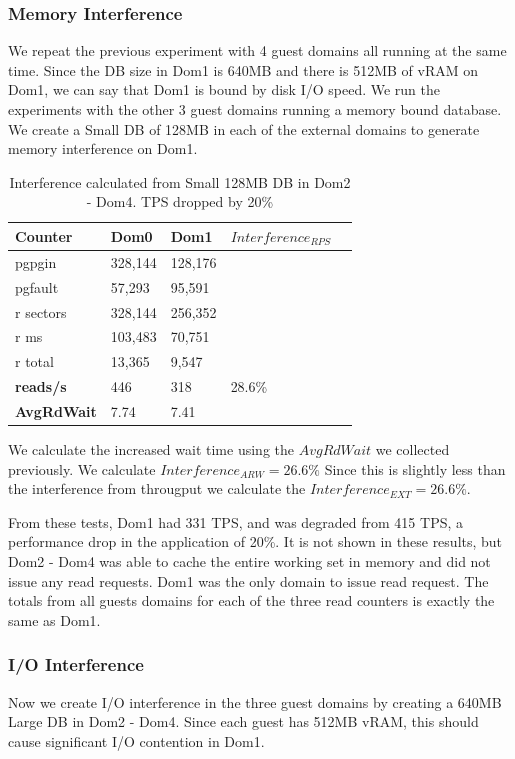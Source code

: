 \subsubsection{Memory Interference}
We repeat the previous experiment with 4 guest domains all running at the same time.  Since the DB size in Dom1 is 640MB and there is 512MB of vRAM on Dom1, we can say that Dom1 is bound by disk I/O speed.  We run the experiments with the other 3 guest domains running a memory bound database.  
We create a Small DB of 128MB in each of the external domains to generate memory interference on Dom1.

\begin{table}[h]
\begin{tabular}{ l l l l p{5cm} }
  Counter & Dom0 & Dom1 & $Interference_{RPS}$ \\
  \hline
	pgpgin    & 328,144 & 128,176 &  \\
	pgfault   &  57,293 &  95,591 &  \\
	r sectors & 328,144 & 256,352 &  \\
	r ms      & 103,483 &  70,751 &  \\
	r total   &  13,365 &   9,547 &  \\
    \textbf{reads/s}    & 446 & 318 & 28.6\%  \\
    \textbf{AvgRdWait}  & 7.74 & 7.41 & \\ 
  \hline
\end{tabular}
\caption{Interference calculated from Small 128MB DB in Dom2 - Dom4.  TPS dropped by 20\%} 
\label{fig:InterferenceSm}
\end{table}
We calculate the increased wait time using the $AvgRdWait$ we collected previously. We calculate $Interference_{ARW} = 26.6\%$  Since this is slightly less than the interference from througput we calculate the $Interference_{EXT} = 26.6\%$.

From these tests, Dom1 had 331 TPS, and was degraded from 415 TPS, a performance drop in the application of 20\%.  It is not shown in these results, but Dom2 - Dom4 was able to cache the entire working set in memory and did not issue any read requests.  Dom1 was the only domain to issue read request. The totals from all guests domains for each of the three read counters is exactly the same as Dom1.  

\subsubsection{I/O Interference}
Now we create I/O interference in the three guest domains by creating a 640MB Large DB in Dom2 - Dom4.  Since each guest has 512MB vRAM, this should cause significant I/O contention in Dom1.

